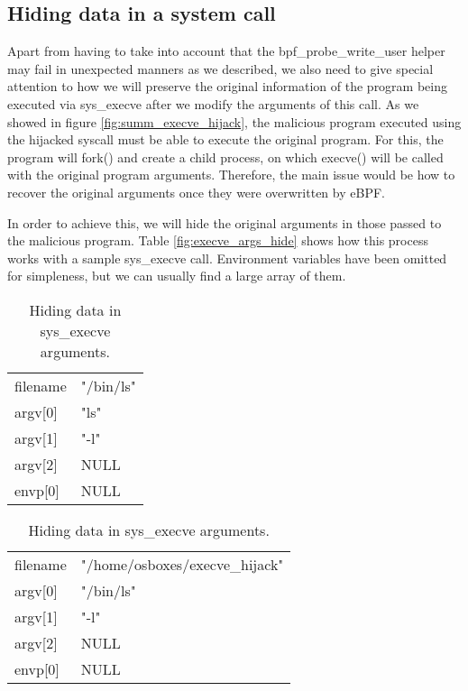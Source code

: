 \subsection{Hiding data in a system call}
Apart from having to take into account that the bpf\_probe\_write\_user helper may fail in unexpected manners as we described, we also need to give special attention to how we will preserve the original information of the program being executed via sys\_execve after we modify the arguments of this call. As we showed in figure \ref{fig:summ_execve_hijack}, the malicious program executed using the hijacked syscall must be able to execute the original program. For this, the program will fork() and create a child process, on which execve() will be called with the original program arguments. Therefore, the main issue would be how to recover the original arguments once they were overwritten by eBPF.

In order to achieve this, we will hide the original arguments in those passed to the malicious program. Table \ref{fig:execve_args_hide} shows how this process works with a sample sys\_execve call. Environment variables have been omitted for simpleness, but we can usually find a large array of them.

\begin{table}[H]
\begin{tabular}{|>{\centering\arraybackslash}p{2cm}|>{\centering\arraybackslash}p{3cm}|}
\hline
\multicolumn{2}{|c|}{Original arguments}\\
\hline
\hline
filename & "/bin/ls"\\
\hline
argv[0] & "ls"\\
\hline
argv[1] & "-l"\\
\hline
argv[2] & NULL\\
\hline
envp[0] & NULL\\
\hline
\end{tabular}
\quad
\begin{tabular}{|>{\centering\arraybackslash}p{2cm}|>{\centering\arraybackslash}p{3cm}|}
\hline
\multicolumn{2}{|c|}{Modified arguments}\\
\hline
\hline
filename & "/home/osboxes/execve\_hijack"\\
\hline
argv[0] & "/bin/ls"\\
\hline
argv[1] & "-l"\\
\hline
argv[2] & NULL\\
\hline
envp[0] & NULL\\
\hline
\end{tabular}
\caption{Hiding data in sys\_execve arguments.}
\label{table:execve_args_hide}
\end{table}

